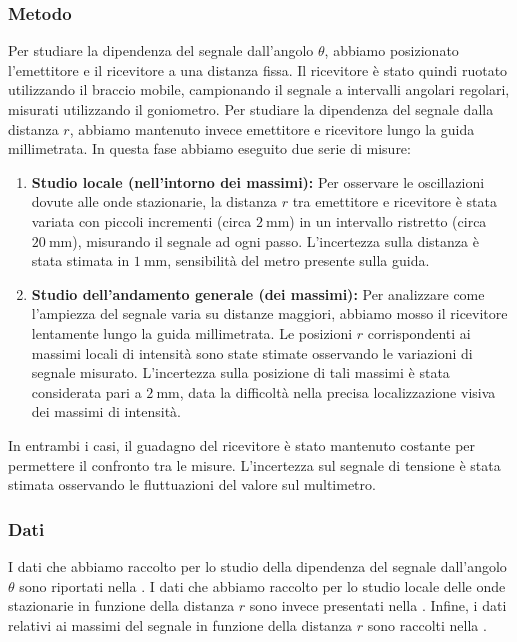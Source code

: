 \documentclass[a4paper]{article}
\begin{document}
\subsubsection{Metodo}
Per studiare la dipendenza del segnale dall'angolo $\theta$, abbiamo posizionato l'emettitore e il ricevitore a una distanza fissa. Il ricevitore è stato quindi ruotato utilizzando il braccio mobile, campionando il segnale a intervalli angolari regolari, misurati utilizzando il goniometro.
Per studiare la dipendenza del segnale dalla distanza $r$, abbiamo mantenuto invece emettitore e ricevitore lungo la guida millimetrata. In questa fase abbiamo eseguito due serie di misure:
\begin{enumerate}
    \item \textbf{Studio locale (nell'intorno dei massimi):} Per osservare le oscillazioni dovute alle onde stazionarie, la distanza $r$ tra emettitore e ricevitore è stata variata con piccoli incrementi (circa $\SI{2}{\milli\metre}$) in un intervallo ristretto (circa $\SI{20}{\milli\metre}$), misurando il segnale ad ogni passo. L'incertezza sulla distanza è stata stimata in $\SI{1}{\milli\metre}$, sensibilità del metro presente sulla guida.
    \item \textbf{Studio dell'andamento generale (dei massimi):} Per analizzare come l'ampiezza del segnale varia su distanze maggiori, abbiamo mosso il ricevitore lentamente lungo la guida millimetrata. Le posizioni $r$ corrispondenti ai massimi locali di intensità sono state stimate osservando le variazioni di segnale misurato. L'incertezza sulla posizione di tali massimi è stata considerata pari a $\SI{2}{\milli\metre}$, data la difficoltà nella precisa localizzazione visiva dei massimi di intensità.
\end{enumerate}
In entrambi i casi, il guadagno del ricevitore è stato mantenuto costante per permettere il confronto tra le misure. L'incertezza sul segnale di tensione è stata stimata osservando le fluttuazioni del valore sul multimetro.

\subsubsection{Dati}
I dati che abbiamo raccolto per lo studio della dipendenza del segnale dall'angolo $\theta$ sono riportati nella .
I dati che abbiamo raccolto per lo studio locale delle onde stazionarie in funzione della distanza $r$ sono invece presentati nella .
Infine, i dati relativi ai massimi del segnale in funzione della distanza $r$ sono raccolti nella .
\end{document}
